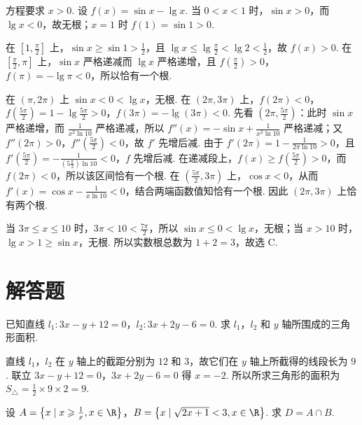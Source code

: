\documentclass[UTF8,a4paper,oneside,11pt]{ctexbook}
\begin{document}
\begin{solution}
方程要求 \(x>0\). 设 \(f(x)=\sin x-\lg x\). 当 \(0<x<1\) 时，\(\sin x>0\)，而 \(\lg x<0\)，故无根；\(x=1\) 时 \(f(1)=\sin1>0\).

在 \([1,\frac\pi2]\) 上，\(\sin x\geqslant\sin1>\frac12\)，且 \(\lg x\leqslant\lg\frac\pi2<\lg2<\frac12\)，故 \(f(x)>0\). 在 \([\frac\pi2,\pi]\) 上，\(\sin x\) 严格递减而 \(\lg x\) 严格递增，且 \(f(\frac\pi2)>0\)，\(f(\pi)=-\lg\pi<0\)，所以恰有一个根.

在 \((\pi,2\pi)\) 上 \(\sin x<0<\lg x\)，无根. 在 \((2\pi,3\pi)\) 上，\(f(2\pi)<0\)，\(f(\frac{5\pi}{2})=1-\lg\frac{5\pi}{2}>0\)，\(f(3\pi)=-\lg(3\pi)<0\). 先看 \((2\pi,\frac{5\pi}{2})\)：此时 \(\sin x\) 严格递增，而 \(\frac1{x^2\ln10}\) 严格递减，所以 \(f''(x)=-\sin x+\frac1{x^2\ln10}\) 严格递减；又 \(f''(2\pi)>0\)，\(f''(\frac{5\pi}{2})<0\)，故 \(f'\) 先增后减. 由于 \(f'(2\pi)=1-\frac1{2\pi\ln10}>0\)，且 \(f'(\frac{5\pi}{2})=-\frac1{(5\frac{\pi}{2})\ln10}<0\)，\(f\) 先增后减. 在递减段上，\(f(x)\geqslant f(\frac{5\pi}{2})>0\)，而 \(f(2\pi)<0\)，所以该区间恰有一个根. 在 \((\frac{5\pi}{2},3\pi)\) 上，\(\cos x<0\)，从而 \(f'(x)=\cos x-\frac1{x\ln10}<0\)，结合两端函数值知恰有一个根. 因此 \((2\pi,3\pi)\) 上恰有两个根.

当 \(3\pi\leqslant x\leqslant10\) 时，\(3\pi<10<\frac{7\pi}{2}\)，所以 \(\sin x\leqslant0<\lg x\)，无根；当 \(x>10\) 时，\(\lg x>1\geqslant\sin x\)，无根. 所以实数根总数为 \(1+2=3\)，故选 C.
\end{solution}

\section{解答题}

\begin{problem}
已知直线 \(l_1:3x-y+12=0\)，\(l_2:3x+2y-6=0\). 求 \(l_1\)，\(l_2\) 和 \(y\) 轴所围成的三角形面积.
\end{problem}

\begin{solution}
直线 \(l_1\)，\(l_2\) 在 \(y\) 轴上的截距分别为 \(12\) 和 \(3\)，故它们在 \(y\) 轴上所截得的线段长为 \(9\). 联立 \(3x-y+12=0\)，\(3x+2y-6=0\) 得 \(x=-2\). 所以所求三角形的面积为 \(S_{\triangle}=\frac{1}{2}\times9\times2=9\).
\end{solution}

\begin{problem}
设 \(A=\left\{ x\mid x\geqslant\frac{1}{x},x\in\R \right\}\)，\(B=\left\{ x\mid \sqrt{2x+1}<3,x\in\R \right\}\). 求 \(D=A\cap B\).
\end{problem}
\end{document}
